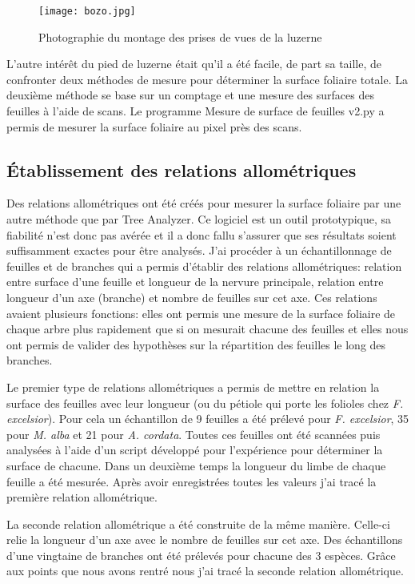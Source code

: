 \documentclass[12pt]{report}
\begin{document}
\begin{figure}[h]
  \centering
  \texttt{[image: bozo.jpg]}
  \caption{Photographie du montage des prises de vues de la luzerne\label{fig:luzerne}}
\end{figure}

L'autre intérêt du pied de luzerne était qu'il a été facile, de part sa taille, de confronter deux
méthodes de mesure pour déterminer la surface foliaire totale. La deuxième
méthode se base sur un comptage et une mesure des surfaces des feuilles à l'aide
de scans. Le programme Mesure de surface de feuilles v2.py\citep{Python_ref40}
a permis de mesurer la surface foliaire au pixel près des scans.


\subsection{Établissement des relations allométriques}

Des relations allométriques ont été créés pour mesurer la surface foliaire par
une autre méthode que par Tree Analyzer. Ce logiciel est un outil prototypique,
sa fiabilité n'est donc pas avérée et il a donc fallu s'assurer que ses
résultats soient suffisamment exactes pour être analysés. J'ai procéder à
un échantillonnage de feuilles et de branches qui a permis d'établir des relations
allométriques: relation entre surface d'une feuille et longueur de la nervure
principale, relation entre longueur d'un axe (branche) et nombre de feuilles sur
cet axe. Ces relations avaient plusieurs fonctions: elles
ont permis une mesure de la surface foliaire de chaque arbre plus rapidement que
si on mesurait chacune des feuilles et elles nous ont permis de valider des
hypothèses sur la répartition des feuilles le long des branches.

Le premier type de relations allométriques a permis de mettre en relation la surface
des feuilles avec leur longueur (ou du pétiole qui porte les
folioles chez \textit{F. excelsior}). Pour cela un échantillon de 9 feuilles a
été prélevé pour \textit{F. excelsior}, 35 pour \textit{M. alba} et 21 pour \textit{A. cordata}.
Toutes ces feuilles ont été scannées puis analysées à l'aide d'un script développé
pour l'expérience pour déterminer la surface de chacune. Dans un deuxième temps
la longueur du limbe de chaque feuille a été mesurée. Après avoir enregistrées
toutes les valeurs j'ai tracé la première relation allométrique.

La seconde relation allométrique a été construite de la même manière. Celle-ci relie
la longueur d'un axe avec le nombre de feuilles sur cet axe. Des échantillons d'une
vingtaine de branches ont été prélevés pour chacune des 3 espèces. Grâce aux points
que nous avons rentré nous j'ai tracé la seconde relation allométrique.
\end{document}
